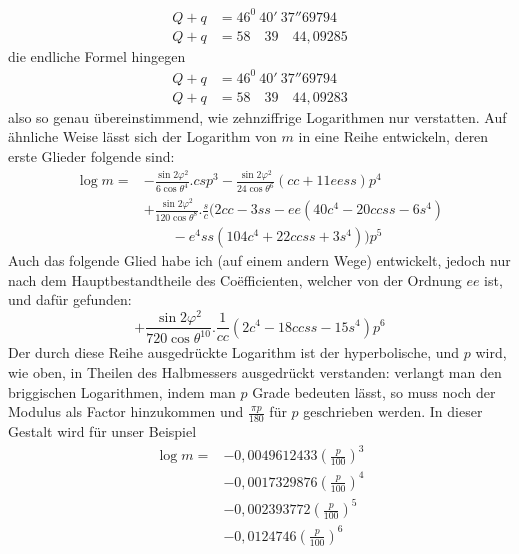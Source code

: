 \[
\begin{aligned}
Q+q&=46^0\ 40'\ 37''69794\\
Q+q&=58\quad39\quad44{,}09285
\end{aligned}
\]
die endliche Formel hingegen
\[
\begin{aligned}
Q+q&=46^0\ 40'\ 37''69794\\
Q+q&=58\quad39\quad44{,}09283
\end{aligned}
\]
also so genau übereinstimmend, wie zehnziffrige Logarithmen nur verstatten.
\indent Auf ähnliche Weise lässt sich der Logarithm von \(m\) in eine Reihe entwickeln, deren erste Glieder folgende sind:
\[
\begin{aligned}
\log m={}&-\frac{\sin2\varphi^2}{6\cos\theta^4}\mathord{.}csp^3-\frac{\sin2\varphi^2}{24\cos\theta^6}(cc+11eess)p^4\\
&+\frac{\sin2\varphi^2}{120\cos\theta^8}\mathord{.}\frac{s}{c}(2cc-3ss-ee(40c^4-20ccss-6s^4)\\
&\qquad-e^4ss(104c^4+22ccss+3s^4))p^5
\end{aligned}
\]
Auch das folgende Glied habe ich (auf einem andern Wege) entwickelt, jedoch nur nach dem Hauptbestandtheile des Coëfficienten, welcher von der Ordnung \(ee\) ist, und dafür gefunden:
\[
+\frac{\sin2\varphi^2}{720\cos\theta^{10}}\mathord{.}\frac{1}{cc}(2c^4-18ccss-15s^4)p^6
\]
\indent Der durch diese Reihe ausgedrückte Logarithm ist der hyperbolische, und \(p\) wird, wie oben, in Theilen des Halbmessers ausgedrückt verstanden: verlangt man den briggischen Logarithmen, indem man \(p\) Grade bedeuten lässt, so muss noch der Modulus als Factor hinzukommen und \(\tfrac{\pi p}{180}\) für \(p\) geschrieben werden. In dieser Gestalt wird für unser Beispiel
\[
\begin{aligned}
\log m={}&-0{,}0049612433(\frac{p}{100})^3\\
&-0{,}0017329876(\frac{p}{100})^4\\
&-0{,}002393772(\frac{p}{100})^5\\
&-0{,}0124746(\frac{p}{100})^6
\end{aligned}
\]
